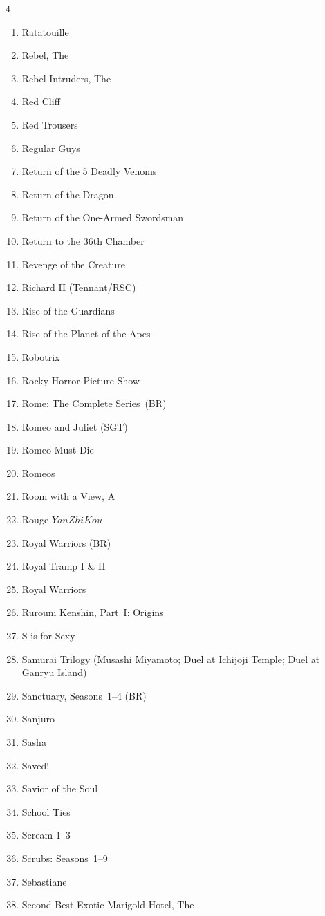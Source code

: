 \documentclass{article}
\begin{document}
\begin{multicols}{4}
\begin{enumerate}
\item Ratatouille
\item Rebel, The
\item Rebel Intruders, The
\item Red Cliff
\item Red Trousers
\item Regular Guys
\item Return of the 5 Deadly Venoms
\item Return of the Dragon
\item Return of the One-Armed Swordsman
\item Return to the 36th Chamber
\item Revenge of the Creature
\item Richard II (Tennant/RSC)
\item Rise of the Guardians
\item Rise of the Planet of the Apes
\item Robotrix
\item Rocky Horror Picture Show
\item Rome: The Complete Series~(BR)
\item Romeo and Juliet (SGT)
\item Romeo Must Die
\item Romeos
\item Room with a View, A
\item Rouge \(Yan Zhi Kou\)
\item Royal Warriors (BR)
\item Royal Tramp I \& II
\item Royal Warriors
\item Rurouni Kenshin, Part~I: Origins
\item S is for Sexy
\item Samurai Trilogy (Musashi Miyamoto; Duel at Ichijoji Temple; Duel
  at Ganryu Island)
\item Sanctuary, Seasons~1--4 (BR)
\item Sanjuro
\item Sasha
\item Saved!
\item Savior of the Soul
\item School Ties
\item Scream 1--3
\item Scrubs: Seasons~1--9
\item Sebastiane
\item Second Best Exotic Marigold Hotel, The

\end{enumerate}
\end{multicols}
\end{document}
